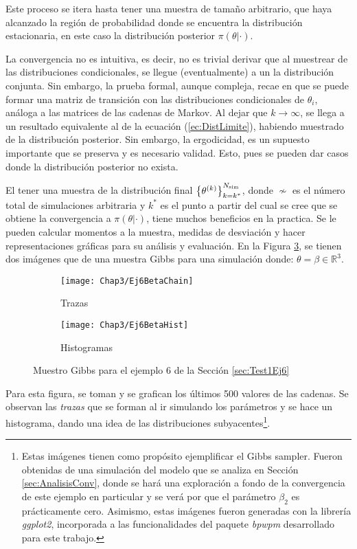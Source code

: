 \documentclass[../Main/Main.tex]{subfiles}
\begin{document}
Este proceso se itera hasta tener una muestra de tamaño arbitrario, que haya alcanzado la región de probabilidad donde se encuentra la distribución estacionaria, en este caso la distribución posterior $\pi(\theta|\cdot)$.

La convergencia no es intuitiva, es decir, no es trivial derivar que al muestrear de las distribuciones condicionales, se llegue (eventualmente) a un la distribución conjunta. Sin embargo, la prueba formal, aunque compleja, recae en que se puede formar una matriz de transición con las distribuciones condicionales de $\theta_i$, análoga a las matrices de las cadenas de Markov. Al dejar que  $k\rightarrow\infty$, se llega a un resultado equivalente al de la ecuación (\ref{ec:DistLimite}), habiendo muestrado de la distribución posterior. Sin embargo, la ergodicidad, es un supuesto importante que se preserva y es necesario validad. Esto, pues se pueden dar casos donde la distribución posterior no exista.

El tener una muestra de la distribución final $\left\{\theta^{(k)}\right\}_{k=k^*}^{N_{\text{sim}}}$, donde $\nsim$ es el número total de simulaciones arbitraria y $k^*$ es el punto a partir del cual se cree que se obtiene la convergencia a $\pi(\theta|\cdot)$, tiene muchos beneficios en la practica. Se le pueden calcular momentos a la muestra, medidas de desviación y hacer representaciones gráficas para su análisis y evaluación. En la Figura \ref{fig:GibbsSamplerSimulado}, se tienen dos imágenes que de una muestra Gibbs para una simulación donde: $\theta = \beta \in \mathbb{R}^3$. 
\begin{figure}[h]
    \centering
    \begin{subfigure}[b]{0.45\textwidth}
        \texttt{[image: Chap3/Ej6BetaChain]}
        \caption{Trazas}
        \label{fig:GibbsChain}
    \end{subfigure}
	\quad
    \begin{subfigure}[b]{0.45\textwidth}
        \texttt{[image: Chap3/Ej6BetaHist]}
        \caption{Histogramas}
        \label{fig:GibbsHist}
    \end{subfigure}
    \caption{Muestro Gibbs para el ejemplo 6 de la Sección \ref{sec:Test1Ej6}}\label{fig:GibbsSamplerSimulado}
\end{figure}
Para esta figura, se toman y se grafican los últimos 500 valores de las cadenas. Se observan las \textit{trazas} que se forman al ir simulando los parámetros y se hace un histograma, dando una idea de las distribuciones subyacentes\footnote{Estas imágenes tienen como propósito ejemplificar el Gibbs sampler. Fueron obtenidas de una simulación del modelo que se analiza en Sección \ref{sec:AnalisisConv}, donde se hará una exploración a fondo de la convergencia de este ejemplo en particular y se verá por que el parámetro $\beta_2$ es prácticamente cero. Asimismo, estas imágenes fueron generadas con la librería \textit{ggplot2}, incorporada a las funcionalidades del paquete \textit{bpwpm} desarrollado para este trabajo.}.
\end{document}
